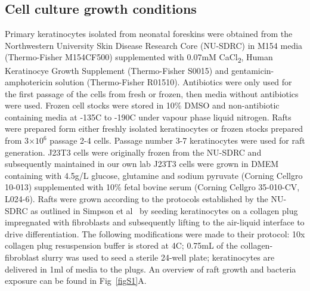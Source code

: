 \documentclass[10pt,letterpaper]{article}
\providecommand{\e}[1]{\ensuremath{\times 10^{#1}}}
\begin{document}
\subsection*{Cell culture growth conditions}
Primary keratinocytes isolated from neonatal foreskins were obtained from the Northwestern University Skin Disease Research Core (NU-SDRC) in M154 media (Thermo-Fisher M154CF500) supplemented with 0.07mM CaCl\textsubscript{2}, Human Keratinocye Growth Supplement (Thermo-Fisher S0015) and gentamicin-amphotericin solution (Thermo-Fisher R01510).
Antibiotics were only used for the first passage of the cells from fresh or frozen, then media without antibiotics were used.
Frozen cell stocks were stored in 10\% DMSO and non-antibiotic containing media at -135\degree C to -190\degree C under vapour phase liquid nitrogen.
Rafts were prepared form either freshly isolated keratinocytes or frozen stocks prepared from 3\e6 passage 2-4 cells.
Passage number 3-7 keratinocytes were used for raft generation.
J23T3 cells were originally frozen from the NU-SDRC and subsequently maintained in our own lab 
J23T3 cells were grown in DMEM containing with 4.5g/L glucose, glutamine and sodium pyruvate (Corning Cellgro 10-013) supplemented with 10\% fetal bovine serum (Corning Cellgro 35-010-CV, L024-6).
Rafts were grown according to the protocols established by the NU-SDRC as outlined in Simpson et al~\cite{simpson_rna_2010} by seeding keratinocytes on a collagen plug impregnated with fibroblasts and subsequently lifting to the air-liquid interface to drive differentiation.
The following modifications were made to their protocol:
10x collagen plug resuspension buffer is stored at 4\degree C;
0.75mL of the collagen-fibroblast slurry was used to seed a sterile 24-well plate;
keratinocytes are delivered in 1ml of media to the plugs.
An overview of raft growth and bacteria exposure can be found in Fig~\ref{figS1}A.
\end{document}

